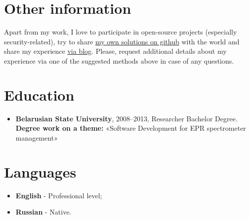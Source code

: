 \documentclass[a4paper, 12pt]{article}
\newcommand{\position}[1]{
    \textbf{#1}}
\begin{document}
\section*{Other information}  
Apart from my work, I love to participate in open-source projects (especially security-related), try to share \href{https://github.com/EasyAppSecurity}{my own solutions on github} with the world and share my experience \href{https://mikhailrusakovich.wordpress.com/}{via blog}. Please, request additional details about my experience via one of the suggested methods above in case of any questions.

\section*{Education}

    \begin{itemize}

        \item \position{Belarusian State University}, 2008--2013, Researcher Bachelor Degree.
            \newline\textbf{Degree work on a theme:} 
            \newline «Software Development for EPR spectrometer management»
    \end{itemize}
    
\section*{Languages}
 	\begin{itemize}
 		 \item \position{English} - Professional level;
 		 \item \position{Russian} - Native.
 	\end{itemize}    
    
\end{document}
